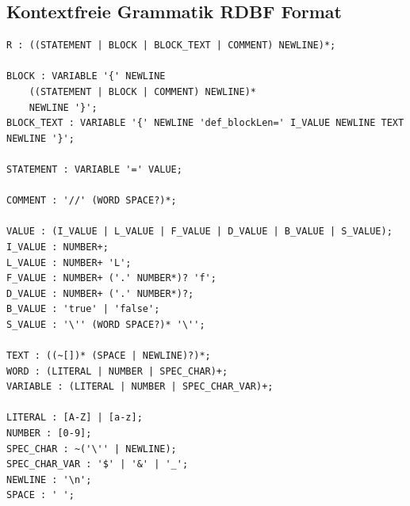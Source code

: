 \documentclass[parskip=full]{scrartcl}
\begin{document}
\subsection{Kontextfreie Grammatik RDBF Format} \label{RDBF}
\begin{verbatim}
R : ((STATEMENT | BLOCK | BLOCK_TEXT | COMMENT) NEWLINE)*;

BLOCK : VARIABLE '{' NEWLINE
	((STATEMENT | BLOCK | COMMENT) NEWLINE)*
	NEWLINE '}';
BLOCK_TEXT : VARIABLE '{' NEWLINE 'def_blockLen=' I_VALUE NEWLINE TEXT NEWLINE '}';
	
STATEMENT : VARIABLE '=' VALUE;

COMMENT : '//' (WORD SPACE?)*;

VALUE : (I_VALUE | L_VALUE | F_VALUE | D_VALUE | B_VALUE | S_VALUE);
I_VALUE : NUMBER+;
L_VALUE : NUMBER+ 'L';
F_VALUE : NUMBER+ ('.' NUMBER*)? 'f';
D_VALUE : NUMBER+ ('.' NUMBER*)?;
B_VALUE : 'true' | 'false';
S_VALUE : '\'' (WORD SPACE?)* '\'';

TEXT : ((~[])* (SPACE | NEWLINE)?)*;
WORD : (LITERAL | NUMBER | SPEC_CHAR)+;
VARIABLE : (LITERAL | NUMBER | SPEC_CHAR_VAR)+;

LITERAL : [A-Z] | [a-z];
NUMBER : [0-9];
SPEC_CHAR : ~('\'' | NEWLINE);
SPEC_CHAR_VAR : '$' | '&' | '_';
NEWLINE : '\n';
SPACE : ' ';
\end{verbatim}
\end{document}
